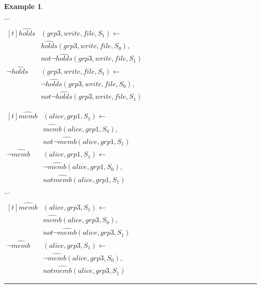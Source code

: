 \documentclass[11pt, twocolumn]{article}
\newtheorem{vexmpl}{Example}
\newenvironment{vexample}
  {\begin{vexmpl}\rm}
  {\rule{2mm}{2mm}\end{vexmpl}}
\begin{document}
\begin{vexample}
\begin{enumerate}
              $\ldots$

              \begin{math}
                \begin{aligned}[t]
                  \hat{holds}&(grp3, write, file, S_{1}) \leftarrow \\
                  & \hat{holds}(grp3, write, file, S_{0}), \\
                  & not \lnot \hat{holds}(grp3, write, file, S_{1}) \\
                  \lnot \hat{holds}&(grp3, write, file, S_{1}) \leftarrow \\
                  & \lnot \hat{holds}(grp3, write, file, S_{0}), \\
                  & not \lnot \hat{holds}(grp3, write, file, S_{1})
                \end{aligned}
              \end{math}

              \begin{math}
                \begin{aligned}[t]
                  \hat{memb}&(alice, grp1, S_{1}) \leftarrow \\
                  & \hat{memb}(alice, grp1, S_{0}), \\
                  & not \lnot \hat{memb}(alice, grp1, S_{1}) \\
                  \lnot \hat{memb}&(alice, grp1, S_{1}) \leftarrow \\
                  & \lnot \hat{memb}(alice, grp1, S_{0}), \\
                  & not \hat{memb}(alice, grp1, S_{1})
                \end{aligned}
              \end{math}

              $\ldots$

              \begin{math}
                \begin{aligned}[t]
                  \hat{memb}&(alice, grp3, S_{1}) \leftarrow \\
                  & \hat{memb}(alice, grp3, S_{0}), \\
                  & not \lnot \hat{memb}(alice, grp3, S_{1}) \\
                  \lnot \hat{memb}&(alice, grp3, S_{1}) \leftarrow \\
                  & \lnot \hat{memb}(alice, grp3, S_{0}), \\
                  & not \hat{memb}(alice, grp3, S_{1})
                \end{aligned}
              \end{math}


\end{enumerate}
\end{vexample}
\end{document}
